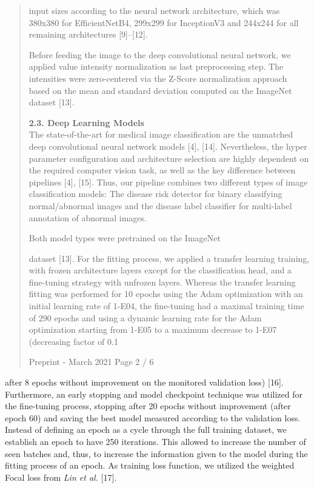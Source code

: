 \documentclass[
]{article}
\begin{document}
\begin{quote}
input sizes according to the neural network architecture, which was
380x380 for EfficientNetB4, 299x299 for InceptionV3 and 244x244 for all
remaining architectures {[}9{]}--{[}12{]}.

Before feeding the image to the deep convolutional neural network, we
applied value intensity normalization as last preprocessing step. The
intensities were zero-centered via the Z-Score normalization approach
based on the mean and standard deviation computed on the ImageNet
dataset {[}13{]}.

\textbf{2.3. Deep Learning Models}\\
The state-of-the-art for medical image classification are the unmatched
deep convolutional neural network models {[}4{]}, {[}14{]}.
Nevertheless, the hyper parameter configuration and architecture
selection are highly dependent on the required computer vision task, as
well as the key difference between pipelines {[}4{]}, {[}15{]}. Thus,
our pipeline combines two different types of image classification
models: The disease risk detector for binary classifying normal/abnormal
images and the disease label classifier for multi-label annotation of
abnormal images.

Both model types were pretrained on the ImageNet

dataset {[}13{]}. For the fitting process, we applied a transfer
learning training, with frozen architecture layers except for the
classification head, and a fine-tuning strategy with unfrozen layers.
Whereas the transfer learning fitting was performed for 10 epochs using
the Adam optimization with an initial learning rate of 1-E04, the
fine-tuning had a maximal training time of 290 epochs and using a
dynamic learning rate for the Adam optimization starting from 1-E05 to a
maximum decrease to 1-E07 (decreasing factor of 0.1

Preprint - March 2021 Page 2 / 6
\end{quote}

after 8 epochs without improvement on the monitored validation loss)
{[}16{]}. Furthermore, an early stopping and model checkpoint technique
was utilized for the fine-tuning process, stopping after 20 epochs
without improvement (after epoch 60) and saving the best model measured
according to the validation loss. Instead of defining an epoch as a
cycle through the full training dataset, we establish an epoch to have
250 iterations. This allowed to increase the number of seen batches and,
thus, to increase the information given to the model during the fitting
process of an epoch. As training loss function, we utilized the weighted
Focal loss from \emph{Lin et al.} {[}17{]}.
\end{document}
